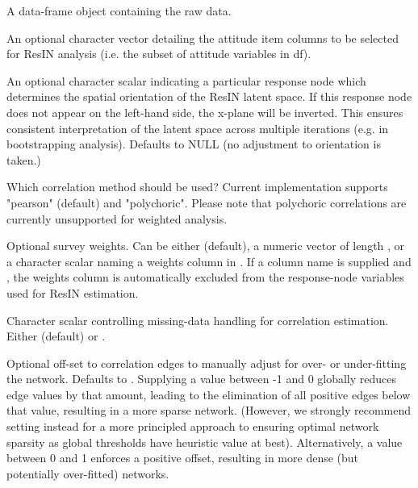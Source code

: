 \documentclass[a4paper]{book}
\begin{document}
\begin{Arguments}
\begin{ldescription}
\item[\code{df}] A data-frame object containing the raw data.

\item[\code{node\_vars}] An optional character vector detailing the attitude item columns to be selected for ResIN analysis (i.e. the subset of attitude variables in df).

\item[\code{left\_anchor}] An optional character scalar indicating a particular response node which determines the spatial orientation of the ResIN latent space. If this response node does not appear on the left-hand side, the x-plane will be inverted. This ensures consistent interpretation of the latent space across multiple iterations (e.g. in bootstrapping analysis). Defaults to NULL (no adjustment to orientation is taken.)

\item[\code{cor\_method}] Which correlation method should be used? Current implementation supports "pearson" (default) and "polychoric". Please note that polychoric correlations are currently unsupported for weighted analysis.

\item[\code{weights}] Optional survey weights. Can be either  (default), a numeric vector of length , or a character scalar naming a weights column in . If a column name is supplied and , the weights column is automatically excluded from the response-node variables used for ResIN estimation.

\item[\code{missing\_cor}] Character scalar controlling missing-data handling for correlation estimation. Either  (default) or  .

\item[\code{offset}] Optional off-set to correlation edges to manually adjust for over- or under-fitting the network. Defaults to . Supplying a value between -1 and 0 globally reduces edge values by that amount, leading to the elimination of all positive  edges below that value, resulting in a more sparse network. (However, we strongly recommend setting  instead for a more principled approach to ensuring optimal network sparsity as global thresholds have heuristic value at best). Alternatively, a value between 0 and 1 enforces a positive offset, resulting in more dense (but potentially over-fitted) networks.


\end{ldescription}
\end{Arguments}
\end{document}
